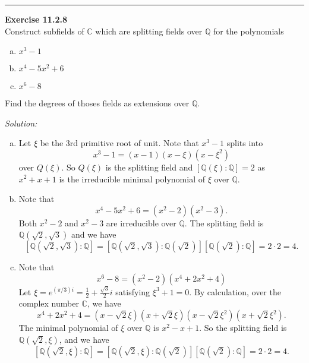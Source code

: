 \documentclass[a4paper, 12pt]{article}
\newenvironment{problem}[2][Exercise]
    { \begin{mdframed}[backgroundcolor=gray!20] \textbf{#1 #2} \\}
    {  \end{mdframed}}
\newenvironment{solution}
    {\textit{Solution:}}
    {}
\begin{document}
\noindent\rule{7in}{2.8pt}
\begin{problem}{11.2.8}
Construct subfields of \(\mathbb{C}\) which are splitting fields over \(\mathbb{Q}\) for the polynomials 
\begin{enumerate}[(a)]
\item \(x^3-1\)
\item \(x^4-5x^2+6\)
\item \(x^6-8\)
\end{enumerate}
Find the degrees of thoses fields as extensions over \(\mathbb{Q}\).
\end{problem}
\begin{solution}
\begin{enumerate}[(a)]
\item Let \(\xi\) be the 3rd primitive root of unit. Note that \(x^3-1\) splits into 
\[x^3-1=(x-1)(x-\xi)(x-\xi^2)\]
over \(Q(\xi)\). So \(Q(\xi)\) is the splitting field and \([\mathbb{Q}(\xi):\mathbb{Q}]=2\) as \(x^2+x+1\) is the irreducible minimal polynomial of \(\xi\) over \(\mathbb{Q}\). 
\item Note that 
\[x^4-5x^2+6=(x^2-2)(x^2-3).\]
Both \(x^2-2\) and \(x^2-3\) are irreducible over \(\mathbb{Q}\). The splitting field is \(\mathbb{Q}(\sqrt{2},\sqrt{3})\) and we have 
\[[\mathbb{Q}(\sqrt{2},\sqrt{3}):\mathbb{Q}]=[\mathbb{Q}(\sqrt{2},\sqrt{3}):\mathbb{Q}(\sqrt{2})][\mathbb{Q}(\sqrt{2}):\mathbb{Q}]=2\cdot 2=4.\]
\item Note that 
\[x^6-8=(x^2-2)(x^4+2x^2+4)\]
Let \(\xi=e^{(\pi/3)i}=\frac{1}{2}+\frac{\sqrt{3}}{2}i\) satisfying \(\xi^3+1=0\). By calculation, over the complex number \(\mathbb{C}\), we have 
\[x^4+2x^2+4=(x-\sqrt{2}\xi)(x+\sqrt{2}\xi)(x-\sqrt{2}\xi^2)(x+\sqrt{2}\xi^2).\]
The minimal polynomial of \(\xi\) over \(\mathbb{Q}\) is \(x^2-x+1\). So the splitting field is \(\mathbb{Q}(\sqrt{2},\xi)\), and we have 
\[[\mathbb{Q}(\sqrt{2},\xi):\mathbb{Q}]=[\mathbb{Q}(\sqrt{2},\xi):\mathbb{Q}(\sqrt{2})][\mathbb{Q}(\sqrt{2}):\mathbb{Q}]=2\cdot 2=4.\]
\end{enumerate}	
\end{solution}
\end{document}
